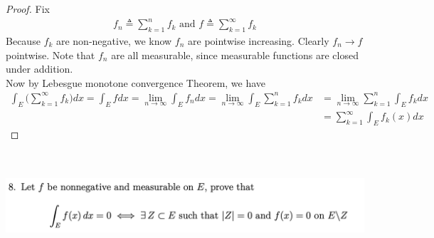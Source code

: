 \documentclass{report}
\begin{document}
\begin{proof}
Fix  
 \begin{align*}
f_n\triangleq \sum_{k=1}^{n}f_k\text{ and }f\triangleq \sum_{k=1}^{\infty}f_k
\end{align*}
Because $f_k$ are non-negative, we know $f_n$ are pointwise increasing. Clearly $f_n \to f$ pointwise. Note that $f_n$ are all measurable, since measurable functions are closed under addition.\\

Now by Lebesgue monotone convergence Theorem, we have 
\begin{align*}
  \int_E  \Big(\sum_{k=1}^{\infty}f_k \Big)dx=\int_E fdx= \lim_{n\to \infty}\int_E f_ndx= \lim_{n\to \infty} \int_E \sum_{k=1}^n f_kdx&= \lim_{n\to \infty}\sum_{k=1}^n \int_E f_kdx\\
&=\sum_{k=1}^{\infty} \int_E f_k(x)dx
\end{align*}
\end{proof}
\begin{question}{}{}
\includegraphics[height=4cm,width=18cm]{hw6a8}
\end{question}
\end{document}
